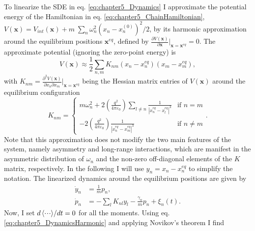 To linearize the SDE in eq. \eqref{eq:chapter5_Dynamics} I approximate the potential energy of the Hamiltonian in eq. \eqref{eq:chapter5_ChainHamiltonian}, $V(\bm{x}) = V_{int}(\bm{x}) + m\;\sum_n \omega_n^2 (x_n-x_n^{(0)})^2/2$, by its harmonic approximation around the equilibrium positions $\bm{x}^{eq}$, defined by  $\frac{\partial V(\bm{x})}{\partial\bm{x}}\Big|_{\bm{x}=\bm{x}^{eq}} = 0$. The approximate potential (ignoring the zero-point energy) is
%
\begin{equation}
    V(\bm{x})\approx  \frac{1}{2} \sum_{n,m} K_{nm} (x_n-x_n^{eq})(x_m-x_m^{eq}),
\end{equation}
%
with $K_{nm} = \frac{\partial^2 V(\bm{x})}{\partial x_n \partial x_m}\Big|_{\bm{x}=\bm{x}^{eq}}$ being the Hessian matrix entries of $V(\bm{x})$ around the equilibrium configuration \cite{James1998}
%
\begin{equation}
    K_{nm} =
    \begin{cases}
        m \omega_n^2 + 2 \left(\frac{q^2}{4\pi\varepsilon_0}\right) \sum_{l \neq n  }\frac{1}{\left|x_n^{eq}-x_l^{eq}\right|^3} & \text{if  } n=m\\

         - 2 \left(\frac{q^2}{4\pi\varepsilon_0}\right) \frac{1}{\left|x_n^{eq}-x_m^{eq}\right|^3} & \text{if  } n \neq m
    \end{cases}.
\end{equation}
%
Note that this approximation does not modify the two main features of the system, namely asymmetry and long-range interactions, which are manifest in the asymmetric distribution of $\omega_n$ and the non-zero off-diagonal elements of the $K$ matrix, respectively. In the following I will use $y_n=x_n-x_n^{eq}$ to simplify the notation. The linearized dynamics around the equilibrium positions are given by
%
\begin{equation}
    \begin{split}
        \dot{y}_n &= \frac{1}{m}p_n,\\
        \dot{p}_n &= -\sum_{l}K_{nl}y_l- \frac{\gamma_n}{m}p_n + \xi_n(t).
    \end{split}
    \label{eq:chapter5_DynamicsHarmonic}
\end{equation}
%
Now, I set ${d\expval{\cdot\!\cdot\!\cdot}}/{dt} = 0$ for all the moments. Using eq. \eqref{eq:chapter5_DynamicsHarmonic} and applying Novikov's theorem I find

